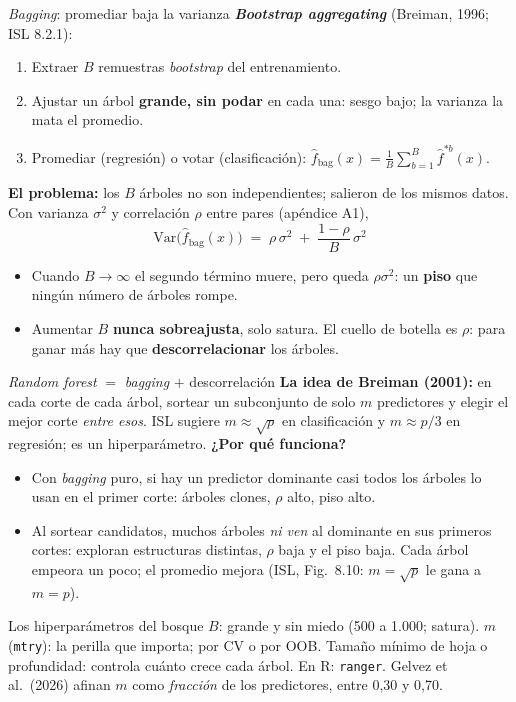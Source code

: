 \documentclass{beamer}
\newcommand{\Var}{\mathrm{Var}}
\newcommand{\1}{\mathbb{I}}
\begin{document}
\begin{frame}{\emph{Bagging}: promediar baja la varianza}
\small
\textbf{\emph{Bootstrap aggregating}} (Breiman, 1996; ISL 8.2.1):
\begin{enumerate}\itemsep1pt
  \item Extraer $B$ remuestras \emph{bootstrap} del entrenamiento.
  \item Ajustar un árbol \textbf{grande, sin podar} en cada una: sesgo bajo; la varianza la mata el promedio.
  \item Promediar (regresión) o votar (clasificación): $\hat{f}_{\text{bag}}(x) = \frac{1}{B} \sum_{b=1}^{B} \hat{f}^{*b}(x)$.
\end{enumerate}
\pause
\textbf{El problema:} los $B$ árboles no son independientes; salieron de los mismos datos. Con varianza $\sigma^2$ y correlación $\rho$ entre pares (apéndice A1),
\[ \boxed{ \; \Var\big( \hat{f}_{\text{bag}}(x) \big) \;=\; \rho\,\sigma^2 \;+\; \frac{1-\rho}{B}\,\sigma^2 \; } \]
\pause
\begin{itemize}\itemsep1pt
  \item Cuando $B \to \infty$ el segundo término muere, pero queda $\rho\sigma^2$: un \textbf{piso} que ningún número de árboles rompe.
  \item Aumentar $B$ \textbf{nunca sobreajusta}, solo satura. El cuello de botella es $\rho$: para ganar más hay que \textbf{descorrelacionar} los árboles.
\end{itemize}
\end{frame}

\begin{frame}{\emph{Random forest} $=$ \emph{bagging} $+$ descorrelación}
\small
\textbf{La idea de Breiman (2001):} en cada corte de cada árbol, sortear un subconjunto de solo $m$ predictores y elegir el mejor corte \emph{entre esos}. ISL sugiere $m \approx \sqrt{p}$ en clasificación y $m \approx p/3$ en regresión; es un hiperparámetro.
\pause
\vspace{0.1cm}
\textbf{¿Por qué funciona?}
\begin{itemize}\itemsep3pt
  \item Con \emph{bagging} puro, si hay un predictor dominante casi todos los árboles lo usan en el primer corte: árboles clones, $\rho$ alto, piso alto.
  \item Al sortear candidatos, muchos árboles \emph{ni ven} al dominante en sus primeros cortes: exploran estructuras distintas, $\rho$ baja y el piso baja. Cada árbol empeora un poco; el promedio mejora (ISL, Fig.\ 8.10: $m = \sqrt{p}$ le gana a $m = p$). \pause
\end{itemize}
\vspace{0.05cm}
\begin{block}{Los hiperparámetros del bosque}
$B$: grande y sin miedo (500 a 1.000; satura). $m$ (\texttt{mtry}): la perilla que importa; por CV o por OOB. Tamaño mínimo de hoja o profundidad: controla cuánto crece cada árbol. En R: \texttt{ranger}. Gelvez et al.\ (2026) afinan $m$ como \emph{fracción} de los predictores, entre 0,30 y 0,70.
\end{block}
\end{frame}
\end{document}
